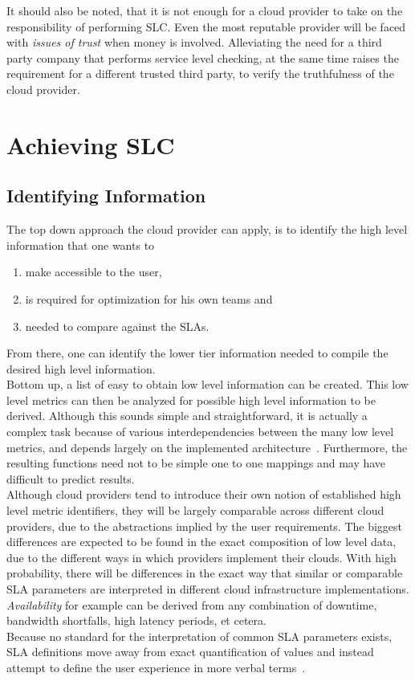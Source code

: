 \documentclass[a4paper]{llncs}
\begin{document}
It should also be noted, that it is not enough for a cloud provider to take on the responsibility of performing SLC. Even the most reputable provider will be faced with \textit{issues of trust} when money is involved. Alleviating the need for a third party company that performs service level checking, at the same time raises the requirement for a different trusted third party, to verify the truthfulness of the cloud provider.\\

\section{Achieving SLC}
\label{sec:achieving_slc}
\subsection{Identifying Information}
The top down approach the cloud provider can apply, is to identify the high level information that one wants to
\begin{enumerate}
	\item make accessible to the user,
	\item is required for optimization for his own teams and
	\item needed to compare against the SLAs.
\end{enumerate}

From there, one can identify the lower tier information needed to compile the desired high level information.\\

Bottom up, a list of easy to obtain low level information can be created. This low level metrics can then be analyzed for possible high level information to be derived.
Although this sounds simple and straightforward, it is actually a complex task because of various interdependencies between the many low level metrics, and depends largely on the implemented architecture~\cite{Undheim11}. Furthermore, the resulting functions need not to be simple one to one mappings and may have difficult to predict results.\\

Although cloud providers tend to introduce their own notion of established high level metric identifiers, they will be largely comparable across different cloud providers, due to the abstractions implied by the user requirements. The biggest differences are expected to be found in the exact composition of low level data, due to the different ways in which providers implement their clouds. With high probability, there will be differences in the exact way that similar or comparable SLA parameters are interpreted in different cloud infrastructure implementations. \textit{Availability} for example can be derived from any combination of downtime, bandwidth shortfalls, high latency periods, et cetera. \\
Because no standard for the interpretation of common SLA parameters exists, SLA definitions move away from exact quantification of values and instead attempt to define the user experience in more verbal terms~\cite{Roxburgh11}.
\end{document}
